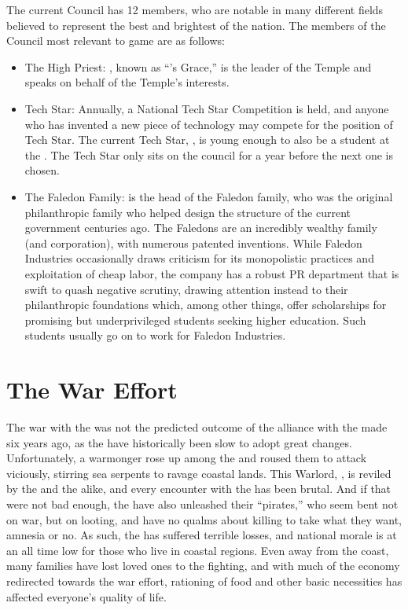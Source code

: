 \documentclass[blue]{GL2020}
\begin{document}
The current Council has 12 members, who are notable in many different fields believed to represent the best and brightest of the nation.  The members of the Council most relevant to game are as follows:
\begin{itemize}
	\item The High Priest: \cAntiChup{\full}, known as “\cTechGod{}'s Grace,” is the leader of the Temple and speaks on behalf of the Temple's interests.
	\item Tech Star: Annually, a National Tech Star Competition is held, and anyone who has invented a new piece of technology may compete for the position of Tech Star.  The current Tech Star, \cTechStar{\full}, is young enough to also be a student at the \pSchool{}.  The Tech Star only sits on the council for a year before the next one is chosen.
	\item The Faledon Family: \cFaledonParent{\full} is the head of the Faledon family, who was the original philanthropic family who helped design the structure of the current government centuries ago.  The Faledons are an incredibly wealthy family (and corporation), with numerous patented inventions.  While Faledon Industries occasionally draws criticism for its monopolistic practices and exploitation of cheap labor, the company has a robust PR department that is swift to quash negative scrutiny, drawing attention instead to their philanthropic foundations which, among other things, offer scholarships for promising but underprivileged students seeking higher education.  Such students usually go on to work for Faledon Industries.  
\end{itemize}

\section*{The War Effort}
The war with the \pShip{} was not the predicted outcome of the alliance with the \pFarm{} made six years ago, as the \pShippies{} have historically been slow to adopt great changes. Unfortunately, a warmonger rose up among the \pShippies{} and roused them to attack viciously, stirring sea serpents to ravage coastal lands.  This Warlord, \cLoud{\full}, is reviled by the \pTechies{} and the \pFarm{} alike, and every encounter with the \pShippies{} has been brutal.  And if that were not bad enough, the \pShip{} have also unleashed their ``pirates,'' who seem bent not on war, but on looting, and have no qualms about killing to take what they want, amnesia or no.  As such, the \pTech{} has suffered terrible losses, and national morale is at an all time low for those who live in coastal regions.  Even away from the coast, many families have lost loved ones to the fighting, and with much of the economy redirected towards the war effort, rationing of food and other basic necessities has affected everyone's quality of life.
\end{document}
